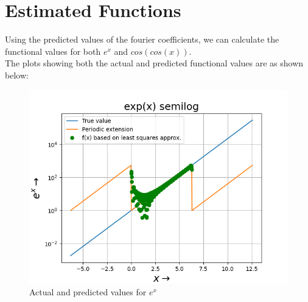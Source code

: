 \documentclass[11pt, a4paper]{article}
\begin{document}
\section{Estimated Functions}
Using the predicted values of the fourier coefficients, we can calculate the functional values for both $e^{x}$ and $cos(cos(x))$. \\
The plots showing both the actual and predicted functional values are as shown below:

 	\begin{figure}[!tbh]
   	\centering
   	\includegraphics[scale=0.6]{Figure_1.png}   
   	\caption{Actual and predicted values for $e^{x}$}
   	\label{fig:sample}
   \end{figure} 
   
\end{document}
